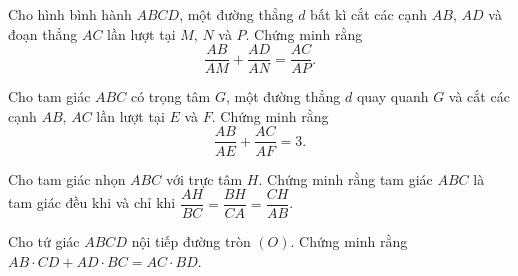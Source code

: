 \begin{bt}%
Cho hình bình hành $ABCD$, một đường thẳng $d$ bất kì cắt các cạnh $AB$, $AD$ và đoạn thẳng $AC$ lần lượt tại $M$, $N$ và $P$. Chứng minh rằng
$$\dfrac{AB}{AM}+\dfrac{AD}{AN}=\dfrac{AC}{AP}.$$
\end{bt}

\begin{bt}%
Cho tam giác $ABC$ có trọng tâm $G$, một đường thẳng $d$ quay quanh $G$ và cắt các cạnh $AB$, $AC$ lần lượt tại $E$ và $F$. Chứng minh rằng
$$\dfrac{AB}{AE}+\dfrac{AC}{AF}=3.$$
\end{bt}

\begin{bt}%
Cho tam giác nhọn $ABC$ với trực tâm $H$. Chứng minh rằng tam giác $ABC$ là tam giác đều khi và chỉ khi $\dfrac{AH}{BC}=\dfrac{BH}{CA}=\dfrac{CH}{AB}$.
\end{bt}

\begin{bt}%
Cho tứ giác $ABCD$ nội tiếp đường tròn $(O)$. Chứng minh rằng $AB\cdot CD+AD\cdot BC=AC\cdot BD$.	
\end{bt}

\setcounter{bt}{0}
